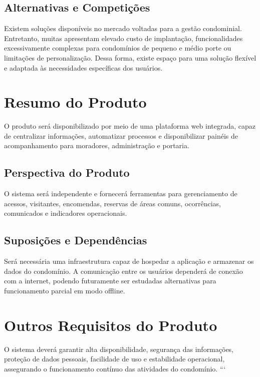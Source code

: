 \subsection{Alternativas e Competições}

Existem soluções disponíveis no mercado voltadas para a gestão condominial. Entretanto, muitas apresentam elevado custo de implantação, funcionalidades excessivamente complexas para condomínios de pequeno e médio porte ou limitações de personalização. Dessa forma, existe espaço para uma solução flexível e adaptada às necessidades específicas dos usuários.

\section{Resumo do Produto}

O produto será disponibilizado por meio de uma plataforma web integrada, capaz de centralizar informações, automatizar processos e disponibilizar painéis de acompanhamento para moradores, administração e portaria.

\subsection{Perspectiva do Produto}

O sistema será independente e fornecerá ferramentas para gerenciamento de acessos, visitantes, encomendas, reservas de áreas comuns, ocorrências, comunicados e indicadores operacionais.

\subsection{Suposições e Dependências}

Será necessária uma infraestrutura capaz de hospedar a aplicação e armazenar os dados do condomínio. A comunicação entre os usuários dependerá de conexão com a internet, podendo futuramente ser estudadas alternativas para funcionamento parcial em modo offline.

\section{Outros Requisitos do Produto}

O sistema deverá garantir alta disponibilidade, segurança das informações, proteção de dados pessoais, facilidade de uso e estabilidade operacional, assegurando o funcionamento contínuo das atividades do condomínio.
```
